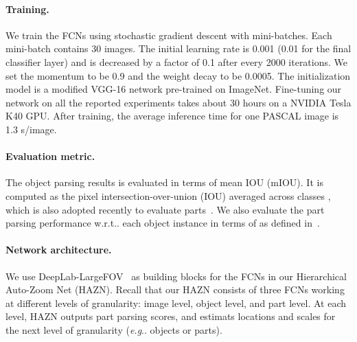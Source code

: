 \documentclass[runningheads]{llncs}
\makeatletter
\DeclareRobustCommand\onedot{\futurelet\@let@token\@onedot}
\def\@onedot{\ifx\@let@token.\else.\null\fi\xspace}
\def\eg{\emph{e.g}\onedot} \def\Eg{\emph{E.g}\onedot}
\def\wrt{w.r.t\onedot} \def\dof{d.o.f\onedot}
\makeatother
\begin{document}
\paragraph{Training.} We train the FCNs using stochastic gradient descent with mini-batches. Each mini-batch contains
30 images. The initial learning rate is 0.001 (0.01 for the final classifier layer) and is decreased by a factor of 0.1 after every 2000 iterations. We set the momentum to be 0.9 and the weight decay to be 0.0005. The initialization model is a modified VGG-16 network pre-trained on ImageNet. Fine-tuning our network on all the reported experiments takes about 30 hours on a NVIDIA Tesla K40 GPU. After training, the average inference time for one PASCAL image is 1.3 s/image.

\paragraph{Evaluation metric.} The object parsing results is evaluated in terms of mean IOU (mIOU). It is computed as the pixel intersection-over-union (IOU) averaged across classes \cite{everingham2014pascal}, which is also adopted recently to evaluate parts~\cite{wang2015joint,chen2015attention}. We also evaluate the part parsing performance \wrt each object instance in terms of  as defined in~\cite{hariharan2014hypercolumns}.


\paragraph{Network architecture.} We use DeepLab-LargeFOV~\cite{chen2014semantic} as building blocks for the FCNs in our Hierarchical Auto-Zoom Net (HAZN). Recall that our HAZN consists of three FCNs working at different levels of granularity: image level, object level, and part level. At each level, HAZN outputs part parsing scores, and estimats locations and scales for the next level of granularity (\eg objects or parts).


\vspace{-0.7\baselineskip}
\end{document}
